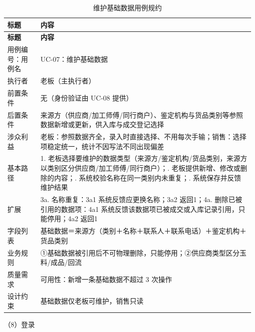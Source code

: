 {\small
\begin{longtable}{@{}L{3.0cm} L{12.3cm}@{}}
\caption{维护基础数据用例规约}\label{tab:uc-07}\\
\toprule
\textbf{标题} & \textbf{内容} \\
\midrule
\endfirsthead
\toprule
\textbf{标题} & \textbf{内容} \\
\midrule
\endhead
用例编号：用例名 & UC-07：维护基础数据 \\
\midrule
执行者 & 老板（主执行者） \\
\midrule
前置条件 & 无（身份验证由 UC-08 提供） \\
\midrule
后置条件 & 来源方（供应商/加工师傅/同行商户）、鉴定机构与货品类别等参照数据新增或更新，供入库与成交登记选择 \\
\midrule
涉众利益 & 老板：参照数据齐全，录入时直接选择、不用每次手输；\newline 销售：选择项稳定统一，统计不因写法不同出现偏差 \\
\midrule
基本路径 & 1. 老板选择要维护的数据类型（来源方/鉴定机构/货品类别，来源方以类别区分供应商/加工师傅/同行商户）；. 老板提供新增、修改或删除的内容；. 系统校验名称在同一类别内未重复；. 系统保存并反馈维护结果 \\
\midrule
扩展 & 3a. 名称重复：3a1 系统反馈应更换名称；3a2 返回1；\newline 4a. 删除已被引用的数据项：4a1 系统反馈该数据项已被成交或入库记录引用，只能停用；4a2 返回1 \\
\midrule
字段列表 & 基础数据＝来源方（类别＋名称＋联系人＋联系电话）＋鉴定机构＋货品类别 \\
\midrule
业务规则 & ①基础数据被引用后不可物理删除，只能停用；\newline ②供应商类型区分玉料/成品/回流 \\
\midrule
质量需求 & 可用性：新增一条基础数据不超过 3 次操作 \\
\midrule
设计约束 & 基础数据仅老板可维护，销售只读 \\
\midrule
\bottomrule
\end{longtable}}
\noindent（8）登录

